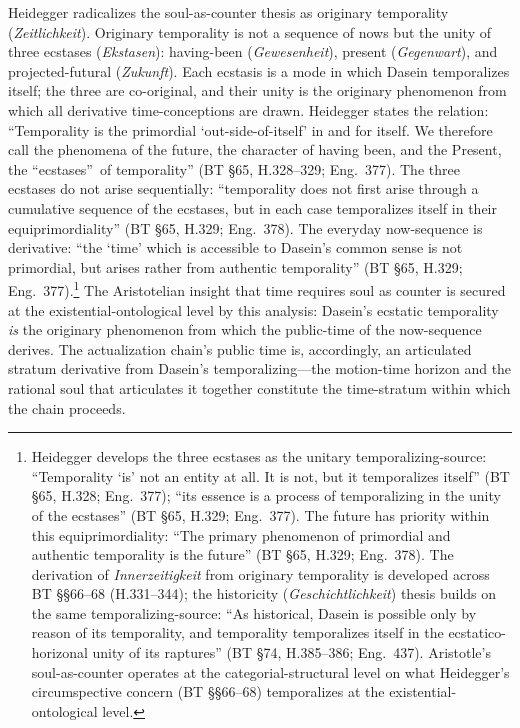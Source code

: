 \documentclass{article}
\begin{document}
Heidegger radicalizes the soul-as-counter thesis as originary temporality (\textit{Zeitlichkeit}). Originary temporality is not a sequence of nows but the unity of three ecstases (\textit{Ekstasen}): having-been (\textit{Gewesenheit}), present (\textit{Gegenwart}), and projected-futural (\textit{Zukunft}). Each ecstasis is a mode in which Dasein temporalizes itself; the three are co-original, and their unity is the originary phenomenon from which all derivative time-conceptions are drawn. Heidegger states the relation: ``Temporality is the primordial `out-side-of-itself' in and for itself. We therefore call the phenomena of the future, the character of having been, and the Present, the \textquotedblleft ecstases\textquotedblright\ of temporality'' (BT \S 65, H.328--329; Eng.~377). The three ecstases do not arise sequentially: ``temporality does not first arise through a cumulative sequence of the ecstases, but in each case temporalizes itself in their equiprimordiality'' (BT \S 65, H.329; Eng.~378). The everyday now-sequence is derivative: ``the `time' which is accessible to Dasein's common sense is not primordial, but arises rather from authentic temporality'' (BT \S 65, H.329; Eng.~377).\footnote{Heidegger develops the three ecstases as the unitary temporalizing-source: ``Temporality `is' not an entity at all. It is not, but it temporalizes itself'' (BT §65, H.328; Eng.~377); ``its essence is a process of temporalizing in the unity of the ecstases'' (BT §65, H.329; Eng.~377). The future has priority within this equiprimordiality: ``The primary phenomenon of primordial and authentic temporality is the future'' (BT §65, H.329; Eng.~378). The derivation of \textit{Innerzeitigkeit} from originary temporality is developed across BT §§66--68 (H.331--344); the historicity (\textit{Geschichtlichkeit}) thesis builds on the same temporalizing-source: ``As historical, Dasein is possible only by reason of its temporality, and temporality temporalizes itself in the ecstatico-horizonal unity of its raptures'' (BT §74, H.385--386; Eng.~437). Aristotle's soul-as-counter operates at the categorial-structural level on what Heidegger's circumspective concern (BT §§66--68) temporalizes at the existential-ontological level.} The Aristotelian insight that time requires soul as counter is secured at the existential-ontological level by this analysis: Dasein's ecstatic temporality \textit{is} the originary phenomenon from which the public-time of the now-sequence derives. The actualization chain's public time is, accordingly, an articulated stratum derivative from Dasein's temporalizing---the motion-time horizon and the rational soul that articulates it together constitute the time-stratum within which the chain proceeds.
\end{document}
